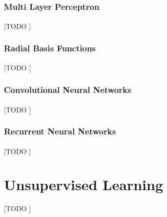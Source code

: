 \documentclass{article}
\begin{document}
			\subsubsection{Multi Layer Perceptron}
			\label{sec:mlp}

				\paragraph{}
				[TODO ]

			\subsubsection{Radial Basis Functions}
			\label{sec:rbf}

				\paragraph{}
				[TODO ]

			\subsubsection{Convolutional Neural Networks}
			\label{sec:cnn}

				\paragraph{}
				[TODO ]

			\subsubsection{Recurrent Neural Networks}
			\label{sec:rnn}

				\paragraph{}
				[TODO ]

	\section{Unsupervised Learning}
	\label{sec:unsupervised-learning}

			\paragraph{}
			[TODO ]


	\nocite{subject:taa}
	\nocite{pactk:py-machine-learning}

  
  
\end{document}
